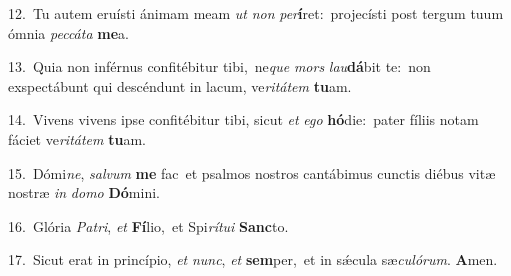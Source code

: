 {\numbfont\textcolor{\numbcolor}{12.}}~Tu autem eruísti ánimam meam \textit{ut} \textit{non} \textit{per}\-\textbf{í}ret:~\star projecísti post tergum tuum ómnia \textit{pec}\-\textit{cá}\textit{ta} \textbf{me}\-a.\par
{\numbfont\textcolor{\numbcolor}{13.}}~Quia non inférnus confitébitur tibi,~\dagger ne\textit{que} \textit{mors} \textit{lau}\-\textbf{dá}bit te:~\star non exspectábunt qui descéndunt in lacum, ve\-\textit{ri}\-\textit{tá}\textit{tem} \textbf{tu}\-am.\par
{\numbfont\textcolor{\numbcolor}{14.}}~Vivens vivens ipse confitébitur tibi, sicut \textit{et} \textit{e}\-\textit{go} \textbf{hó}\-die:~\star pater fíliis notam fáciet ve\-\textit{ri}\-\textit{tá}\textit{tem} \textbf{tu}\-am.\par
{\numbfont\textcolor{\numbcolor}{15.}}~Dómi\-\textit{ne}\-, \textit{sal}\-\textit{vum} \textbf{me} fac~\star et psalmos nostros cantábimus cunctis diébus vitæ nostræ \textit{in} \textit{do}\-\textit{mo} \textbf{Dó}\-mini.\par
{\numbfont\textcolor{\numbcolor}{16.}}~Glória \textit{Pa}\-\textit{tri}, \textit{et} \textbf{Fí}\-lio,~\star et Spi\-\textit{rí}\-\textit{tu}\textit{i} \textbf{Sanc}\-to.\par
{\numbfont\textcolor{\numbcolor}{17.}}~Sicut erat in princípio, \textit{et} \textit{nunc}\-, \textit{et} \textbf{sem}\-per,~\star et in sǽcula sæ\-\textit{cu}\-\textit{ló}\textit{rum}. \textbf{A}\-men.\par
